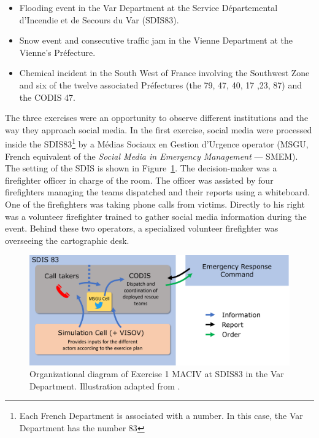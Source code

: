\begin{itemize}
    \item Flooding event in the Var Department at the Service Départemental d’Incendie et de Secours du Var (SDIS83).
    \item Snow event and consecutive traffic jam in the Vienne Department at the Vienne's Préfecture.
    \item Chemical incident in the South West of France involving the Southwest Zone and six of the twelve associated Préfectures (the 79, 47, 40, 17 ,23, 87) and the CODIS 47.
\end{itemize}

The three exercises were an opportunity to observe different institutions and the way they approach social media.
In the first exercise, social media were processed inside the SDIS83\footnote{Each French Department is associated with a number. In this case, the Var Department has the number 83}
by a Médias Sociaux en Gestion d'Urgence operator (MSGU, French equivalent of the \textit{Social Media in Emergency Management} — SMEM).
The setting of the SDIS is shown in Figure~\ref{information:exercice-1-setup}.
The decision-maker was a firefighter officer in charge of the room.
The officer was assisted by four firefighters managing the teams dispatched and their reports using a whiteboard.
One of the firefighters was taking phone calls from victims.
Directly to his right was a volunteer firefighter trained to gather social media information during the event.
Behind these two operators, a specialized volunteer firefighter was overseeing the cartographic desk.

\begin{figure}[htb]
    \centering
    \includegraphics[width=\textwidth]{figures/chap-3/exercice-1-setup.pdf}
    \caption{Organizational diagram of Exercise 1 MACIV at SDIS83 in the Var Department. Illustration adapted from \textcite{batardIntegrerContributionsCitoyennes2021}.}
    \label{information:exercice-1-setup}
\end{figure}

